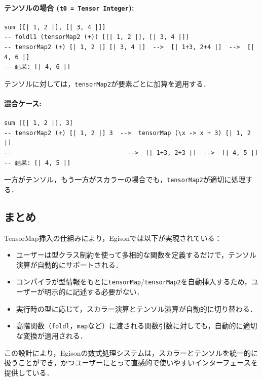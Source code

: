 \paragraph{テンソルの場合 (\lstinline{t0 = Tensor Integer}):}
\begin{lstlisting}[language=egison,numbers=none]
sum [[| 1, 2 |], [| 3, 4 |]]
-- foldl1 (tensorMap2 (+)) [[| 1, 2 |], [| 3, 4 |]]
-- tensorMap2 (+) [| 1, 2 |] [| 3, 4 |]  -->  [| 1+3, 2+4 |]  -->  [| 4, 6 |]
-- 結果: [| 4, 6 |]
\end{lstlisting}

テンソルに対しては，\lstinline{tensorMap2}が要素ごとに加算を適用する．

\paragraph{混合ケース:}
\begin{lstlisting}[language=egison,numbers=none]
sum [[| 1, 2 |], 3]
-- tensorMap2 (+) [| 1, 2 |] 3  -->  tensorMap (\x -> x + 3) [| 1, 2 |]
--                                -->  [| 1+3, 2+3 |]  -->  [| 4, 5 |]
-- 結果: [| 4, 5 |]
\end{lstlisting}

一方がテンソル，もう一方がスカラーの場合でも，\lstinline{tensorMap2}が適切に処理する．

\subsection{まとめ}

TensorMap挿入の仕組みにより，Egisonでは以下が実現されている：

\begin{itemize}
\item ユーザーは型クラス制約を使って多相的な関数を定義するだけで，テンソル演算が自動的にサポートされる．
\item コンパイラが型情報をもとに\lstinline{tensorMap}/\lstinline{tensorMap2}を自動挿入するため，ユーザーが明示的に記述する必要がない．
\item 実行時の型に応じて，スカラー演算とテンソル演算が自動的に切り替わる．
\item 高階関数（\lstinline{foldl}，\lstinline{map}など）に渡される関数引数に対しても，自動的に適切な変換が適用される．
\end{itemize}

この設計により，Egisonの数式処理システムは，スカラーとテンソルを統一的に扱うことができ，かつユーザーにとって直感的で使いやすいインターフェースを提供している．
